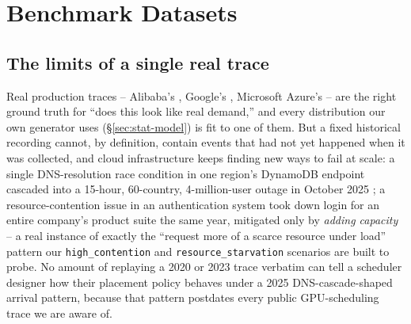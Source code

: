 \documentclass[11pt]{article}
\begin{document}
\section{Benchmark Datasets}
\label{sec:datasets}

\subsection{The limits of a single real trace}
Real production traces -- Alibaba's \citep{alibabatrace2020,alibabatrace2023},
Google's \citep{reiss2012}, Microsoft Azure's \citep{cortez2017,shahrad2020}
-- are the right ground truth for ``does this look like real demand,''
and every distribution our own generator uses (\S\ref{sec:stat-model}) is
fit to one of them. But a fixed historical recording cannot, by
definition, contain events that had not yet happened when it was
collected, and cloud infrastructure keeps finding new ways to fail at
scale: a single DNS-resolution race condition in one region's DynamoDB
endpoint cascaded into a 15-hour, 60-country, 4-million-user outage in
October 2025 \citep{awsoutage2025}; a resource-contention issue in an
authentication system took down login for an entire company's product
suite the same year, mitigated only by \emph{adding capacity}
\citep{outagestats2025} -- a real instance of exactly the
``request more of a scarce resource under load'' pattern our
\texttt{high\_contention} and \texttt{resource\_starvation} scenarios are
built to probe. No amount of replaying a 2020 or 2023 trace verbatim can
tell a scheduler designer how their placement policy behaves under a 2025
DNS-cascade-shaped arrival pattern, because that pattern postdates every
public GPU-scheduling trace we are aware of.
\end{document}
